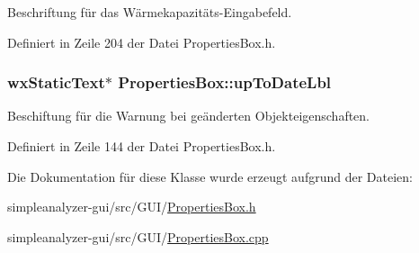 Beschriftung für das Wärmekapazitäts-\/\-Eingabefeld. 



Definiert in Zeile 204 der Datei Properties\-Box.\-h.

\hypertarget{classPropertiesBox_acd0a5ccaa4e981b961685c5714e67f92}{
\subsubsection[{up\-To\-Date\-Lbl}]{\setlength{\rightskip}{0pt plus 5cm}wx\-Static\-Text$\ast$ Properties\-Box\-::up\-To\-Date\-Lbl\hspace{0.3cm}{\ttfamily [private]}}}\label{classPropertiesBox_acd0a5ccaa4e981b961685c5714e67f92}


Beschiftung für die Warnung bei geänderten Objekteigenschaften. 



Definiert in Zeile 144 der Datei Properties\-Box.\-h.



Die Dokumentation für diese Klasse wurde erzeugt aufgrund der Dateien\-:\begin{DoxyCompactItemize}
\item 
simpleanalyzer-\/gui/src/\-G\-U\-I/\hyperlink{PropertiesBox_8h}{Properties\-Box.\-h}\item 
simpleanalyzer-\/gui/src/\-G\-U\-I/\hyperlink{PropertiesBox_8cpp}{Properties\-Box.\-cpp}\end{DoxyCompactItemize}
